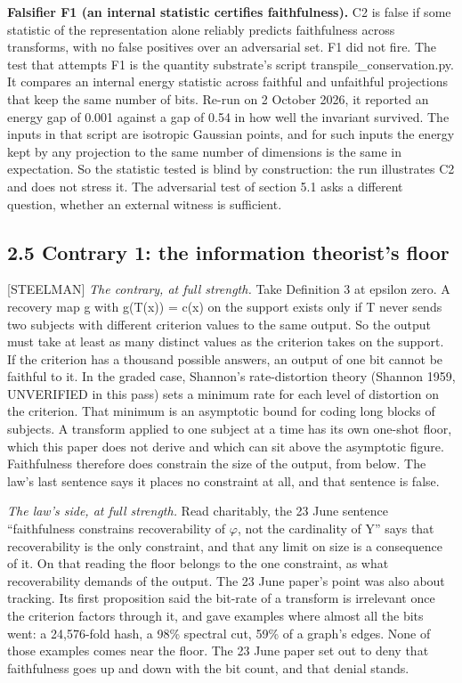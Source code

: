 \documentclass[11pt]{article}
\newcommand{\register}[1]{{\ttfamily\small #1}}
\begin{document}
\textbf{Falsifier F1 (an internal statistic certifies faithfulness).} C2 is false if some statistic of the representation alone reliably predicts faithfulness across transforms, with no false positives over an adversarial set. F1 did not fire. The test that attempts F1 is the quantity substrate's script transpile\_conservation.py. It compares an internal energy statistic across faithful and unfaithful projections that keep the same number of bits. Re-run on 2 October 2026, it reported an energy gap of 0.001 against a gap of 0.54 in how well the invariant survived. The inputs in that script are isotropic Gaussian points, and for such inputs the energy kept by any projection to the same number of dimensions is the same in expectation. So the statistic tested is blind by construction: the run illustrates C2 and does not stress it. The adversarial test of section 5.1 asks a different question, whether an external witness is sufficient.

\subsection*{2.5 Contrary 1: the information theorist's floor}

\register{[STEELMAN]} \emph{The contrary, at full strength.} Take Definition 3 at epsilon zero. A recovery map g with g(T(x)) = c(x) on the support exists only if T never sends two subjects with different criterion values to the same output. So the output must take at least as many distinct values as the criterion takes on the support. If the criterion has a thousand possible answers, an output of one bit cannot be faithful to it. In the graded case, Shannon's rate-distortion theory (Shannon 1959, UNVERIFIED in this pass) sets a minimum rate for each level of distortion on the criterion. That minimum is an asymptotic bound for coding long blocks of subjects. A transform applied to one subject at a time has its own one-shot floor, which this paper does not derive and which can sit above the asymptotic figure. Faithfulness therefore does constrain the size of the output, from below. The law's last sentence says it places no constraint at all, and that sentence is false.

\emph{The law's side, at full strength.} Read charitably, the 23 June sentence ``faithfulness constrains recoverability of \ensuremath{\varphi}, not the cardinality of Y'' says that recoverability is the only constraint, and that any limit on size is a consequence of it. On that reading the floor belongs to the one constraint, as what recoverability demands of the output. The 23 June paper's point was also about tracking. Its first proposition said the bit-rate of a transform is irrelevant once the criterion factors through it, and gave examples where almost all the bits went: a 24,576-fold hash, a 98\% spectral cut, 59\% of a graph's edges. None of those examples comes near the floor. The 23 June paper set out to deny that faithfulness goes up and down with the bit count, and that denial stands.
\end{document}
